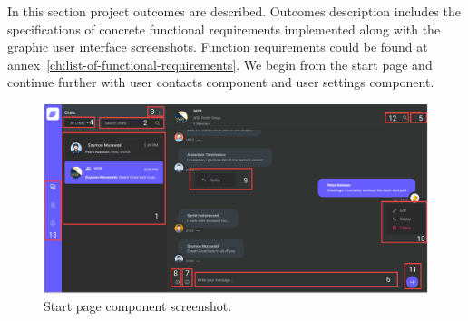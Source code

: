 In this section project outcomes are described.
Outcomes description includes the specifications of concrete functional requirements implemented along with the
graphic user interface screenshots.
Function requirements could be found at annex~\ref{ch:list-of-functional-requirements}.
We begin from the start page and continue further with user contacts component and user settings component.
\begin{figure}[H]
    \centering
    \includegraphics[width=1\textwidth]{Pictures/09_Messenger_startpage}
    \caption{Start page component screenshot.}\label{fig:figure5}
\end{figure}

